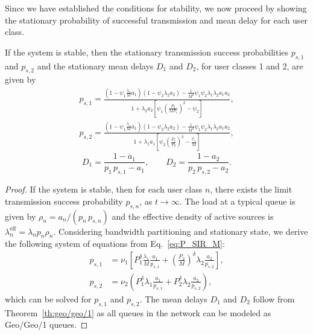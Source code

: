 Since we have established the conditions for stability, we now proceed by showing the stationary probability of successful transmission and mean delay for each user class. 

\begin{proposition}\label{prop:stationary}
	If the system is stable, then the stationary transmission success probabilities $p_{s,1}$ and $p_{s,2}$ and the stationary mean delays $D_1$ and $D_2$, for user classes 1 and 2, are given by 
\begin{gather*}
    	p_{s,1} = \frac{(1-\psi_1\tfrac{\lambda_1}{M}a_1)(1-\psi_2\lambda_2 a_2)
        	- \tfrac{1}{M^\delta}\psi_1\psi_2\lambda_1\lambda_2 a_1 a_2}
            {1+\lambda_2 a_2 \left[\psi_1\left(\tfrac{P_2}{M P_1}\right)^\delta-\psi_2\right]},\\
    	p_{s,2} = \frac{(1-\psi_1\tfrac{\lambda_1}{M}a_1)(1-\psi_2\lambda_2 a_2)
        	- \tfrac{1}{M^\delta}\psi_1\psi_2\lambda_1\lambda_2 a_1 a_2}
            {1+\lambda_1 a_1 \left[\psi_2\left(\tfrac{P_1}{P_2}\right)^\delta-\tfrac{\psi_1}{M}\right]},
     \end{gather*}  
     \begin{equation*}       
    	D_1 = \frac{1-a_1}{p_1\,p_{s,1}-a_1}, \qquad
    	D_2 = \frac{1-a_2}{p_2\,p_{s,2}-a_2}.
    \end{equation*}
\end{proposition}

\begin{proof}
	If the system is stable, then for each user class $n$, there exists the limit transmission success probability $p_{s,n}$, as $t\to \infty$. The load at a typical queue is given by $\rho_n = a_n/(p_n\,p_{s,n})$ and the effective density of active sources is $\lambda_n^\mathrm{eff}=\lambda_n p_n\rho_n$. Considering bandwidth partitioning and stationary state, we derive the following system of equations from Eq.~\eqref{eq:P_SIR_M}:
\begin{align*}
	p_{s,1} 
    	&= \nu_1\!\left[ P_1^\delta \tfrac{\lambda_1}{M} \tfrac{a_1}{p_{s,1}}
        	+\left(\tfrac{P_2}{M}\right)^\delta\!\lambda_2\tfrac{a_2}{p_{s,2}}\right],\\
	p_{s,2} 
    	&= \nu_2\!\left( P_1^\delta \lambda_1 \tfrac{a_1}{p_{s,1}}
        	+P_2^\delta \lambda_2 \tfrac{a_2}{p_{s,2}}\right),
\end{align*}
	which can be solved for $p_{s,1}$ and $p_{s,2}$. The mean delays $D_1$ and $D_2$ follow from Theorem~\ref{th:geo/geo/1} as all queues in the network can be modeled as Geo/Geo/1 queues. 
\end{proof}


